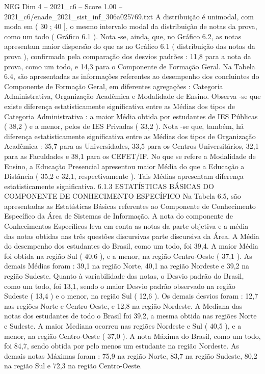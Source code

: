 \begin{textsample}{NEG Dim 4 – 2021\_c6 – Score 1.00 – 2021\_c6/enade\_2021\_sist\_inf\_306a025769.txt}
A distribuição é unimodal, com moda em ( 30 ; 40 ], o mesmo intervalo modal da distribuição de notas da prova, como um todo ( Gráfico 6.1 ).
Nota -se, ainda, que, no Gráfico 6.2, as notas apresentam maior dispersão do que as no Gráfico 6.1 ( distribuição das notas da prova ), confirmada pela comparação dos desvios padrões : 11,8 para a nota da prova, como um todo, e 14,3 para o Componente de Formação Geral.
Na Tabela 6.4, são apresentadas as informações referentes ao desempenho dos concluintes do Componente de Formação Geral, em diferentes agregações : Categoria Administrativa, Organização Acadêmica e Modalidade de Ensino.
Observa -se que existe diferença estatisticamente significativa entre as Médias dos tipos de Categoria Administrativa : a maior Média obtida por estudantes de IES Públicas ( 38,2 ) e a menor, pelos de IES Privadas ( 33,2 ).
Nota -se que, também, há diferença estatisticamente significativa entre as Médias dos tipos de Organização Acadêmica : 35,7 para as Universidades, 33,5 para os Centros Universitários, 32,1 para as Faculdades e 38,1 para os CEFET/IF.
No que se refere a Modalidade de Ensino, a Educação Presencial apresentou maior Média do que a Educação a Distância ( 35,2 e 32,1, respectivamente ).
Tais Médias apresentam diferença estatisticamente significativa. 6.1.3 ESTATÍSTICAS BÁSICAS DO COMPONENTE DE CONHECIMENTO ESPECÍFICO Na Tabela 6.5, são apresentadas as Estatísticas Básicas referentes ao Componente de Conhecimento Específico da Área de Sistemas de Informação.
A nota do componente de Conhecimentos Específicos leva em conta as notas da parte objetiva e a média das notas obtidas nas três questões discursivas parte discursiva da Área.
A Média do desempenho dos estudantes do Brasil, como um todo, foi 39,4.
A maior Média foi obtida na região Sul ( 40,6 ), e a menor, na região Centro-Oeste ( 37,1 ).
As demais Médias foram : 39,1 na região Norte, 40,1 na região Nordeste e 39,2 na região Sudeste.
Quanto à variabilidade das notas, o Desvio padrão do Brasil, como um todo, foi 13,1, sendo o maior Desvio padrão observado na região Sudeste ( 13,4 ) e o menor, na região Sul ( 12,6 ).
Os demais desvios foram : 12,7 nas regiões Norte e Centro-Oeste, e 12,8 na região Nordeste.
A Mediana das notas dos estudantes de todo o Brasil foi 39,2, a mesma obtida nas regiões Norte e Sudeste.
A maior Mediana ocorreu nas regiões Nordeste e Sul ( 40,5 ), e a menor, na região Centro-Oeste ( 37,0 ).
A nota Máxima do Brasil, como um todo, foi 84,7, sendo obtida por pelo menos um estudante na região Nordeste.
As demais notas Máximas foram : 75,9 na região Norte, 83,7 na região Sudeste, 80,2 na região Sul e 72,3 na região Centro-Oeste.

\end{textsample}
